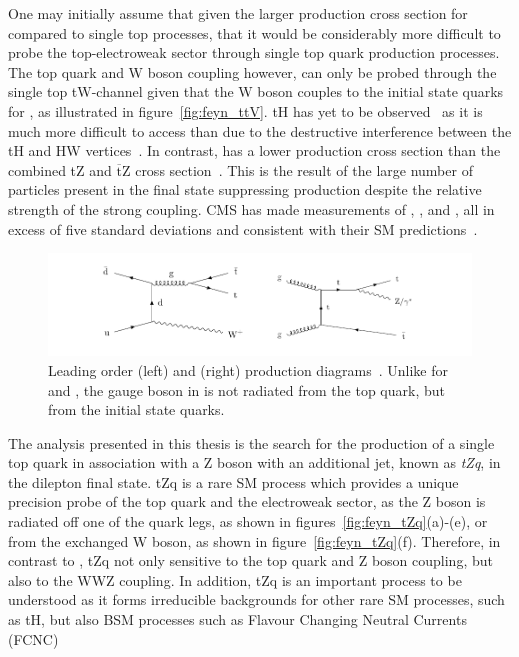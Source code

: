One may initially assume that given the larger production cross section for \ttbar compared to single top processes, that it would be considerably more difficult to probe the top-electroweak sector through single top quark production processes.
The top quark and W boson coupling however, can only be probed through the single top tW-channel given that the W boson couples to the initial state quarks for \ttW, as illustrated in figure~\ref{fig:feyn_ttV}.
tH has yet to be observed~\cite{CMS:2018jsz} as it is much more difficult to access than \ttH due to the destructive interference between the tH and HW vertices~\cite{Maltoni:2001hu}.
In contrast, \ttZ has a lower production cross section than the combined tZ and $\overline{\text{t}}$Z cross section~\cite{Campbell:2013yla}.
This is the result of the large number of particles present in the \ttZ final state suppressing \ttZ production despite the relative strength of the strong coupling.
CMS has made measurements of \ttH, \ttW, and \ttZ, all in excess of five standard deviations and consistent with their SM predictions~\cite{Sirunyan:2017uzs,Sirunyan:2018hoz}.

\begin{figure}[p]
\centering
\includegraphics[width=\textwidth]{figs/top-physics/CMS-TOP-17-005_Figure_001.pdf}
\caption{Leading order \ttW (left) and \ttZ (right) production diagrams~\cite{Sirunyan:2017uzs}. Unlike for \ttZ and \ttH, the gauge boson in \ttW is not radiated from the top quark, but from the initial state quarks.}
\label{fig:deyn_ttV}
\end{figure}

The analysis presented in this thesis is the search for the production of a single top quark in association with a Z boson with an additional jet, known as \emph{tZq}, in the dilepton final state.
tZq is a rare SM process which provides a unique precision probe of the top quark and the electroweak sector, as the Z boson is radiated off one of the quark legs, as shown in figures~\ref{fig:feyn_tZq}(a)-(e), or from the exchanged W boson, as shown in figure~\ref{fig:feyn_tZq}(f).
Therefore, in contrast to \ttZ, tZq not only sensitive to the top quark and Z boson coupling, but also to the WWZ coupling.
In addition, tZq is an important process to be understood as it forms irreducible backgrounds for other rare SM processes, such as tH, but also BSM processes such as Flavour Changing Neutral Currents (FCNC)~\cite{AguilarSaavedra:2004wm}


